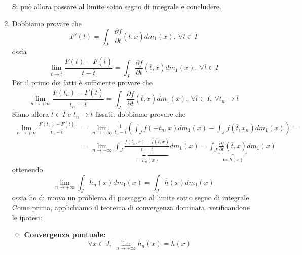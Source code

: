 \begin{demonstration}
\begin{enumerate}[label=\Roman*]
\begin{itemize}
\begin{equation*}
\end{equation*}
\end{itemize}
Si può allora passare al limite sotto segno di integrale e concludere.
\item Dobbiamo provare che
\begin{equation*}
	F'\left(t\right)=\int_J\frac{\partial f}{\partial t}\left(\overline{t},x\right)dm_1\left(x\right),\ \forall \overline{t}\in I
\end{equation*}
ossia
\begin{equation*}
	\lim_{t\to\overline{t}}\frac{F\left(t\right)-F\left(\overline{t}\right)}{t-\overline{t}}=\int_J\frac{\partial f}{\partial t}\left(\overline{t},x\right)dm_1\left(x\right),\ \forall \overline{t}\in I
\end{equation*}
Per il primo dei fatti è sufficiente provare che
\begin{equation*}
	\lim_{n\to+\infty}\frac{F\left(t_n\right)-F\left(\overline{t}\right)}{t_n-\overline{t}}=\int_J\frac{\partial f}{\partial t}\left(\overline{t},x\right)dm_1\left(x\right),\ \forall \overline{t}\in I,\ \forall t_n\to \overline{t}
\end{equation*}
Siano allora $\overline{t}\in I$ e $t_n\to\overline{t}$ fissati: dobbiamo provare che
\begin{align*}
	\lim_{n\to+\infty}\frac{F\left(t_n\right)-F\left(\overline{t}\right)}{t_n-\overline{t}}&=\lim_{n\to+\infty}\frac{1}{t_n-\overline{t}}\left(\int_Jf\left(+t_n,x\right)dm_1\left(x\right)-\int_Jf\left(\overline{t},x_n\right)dm_1\left(x\right)\right)=\\
	&=\lim_{n\to+\infty}\int_J\underbrace{\frac{f\left(t_n,x\right)-f\left(\overline{t},x\right)}{t_n-\overline{t}}}_{\coloneqq h_n\left(x\right)}dm_1\left(x\right)=\int_J\underbrace{\frac{\partial f}{\partial t}\left(\overline{t},x\right)}_{\coloneqq \overline{h}\left(x\right)}dm_1\left(x\right)
\end{align*}
ottenendo
\begin{equation*}
	\lim_{n\to+\infty}\int_Jh_n\left(x\right)dm_1\left(x\right)=\int_J\overline{h}\left(x\right)dm_1\left(x\right)
\end{equation*}
ossia ho di nuovo un problema di passaggio al limite sotto segno di integrale. Come prima, applichiamo il teorema di convergenza dominata, verificandone le ipotesi:
\begin{itemize}
	\item \textbf{Convergenza puntuale:}
	\begin{equation*}
		\forall x\in J,\ \lim_{n\to+\infty}h_n\left(x\right)=\overline{h}\left(x\right)

\end{equation*}
\end{itemize}
\end{enumerate}
\end{demonstration}
